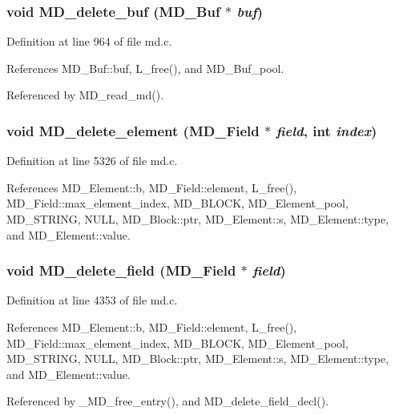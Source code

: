 \subsubsection{\setlength{\rightskip}{0pt plus 5cm}void MD\_\-delete\_\-buf (\bf{MD\_\-Buf} $\ast$ {\em buf})}\label{md_8c_765d5d55709d6e3d548642e0adef32a1}




Definition at line 964 of file md.c.

References MD\_\-Buf::buf, L\_\-free(), and MD\_\-Buf\_\-pool.

Referenced by MD\_\-read\_\-md().
\subsubsection{\setlength{\rightskip}{0pt plus 5cm}void MD\_\-delete\_\-element (\bf{MD\_\-Field} $\ast$ {\em field}, int {\em index})}\label{md_8c_323c95e323e8e32f489e998a83f87c53}




Definition at line 5326 of file md.c.

References MD\_\-Element::b, MD\_\-Field::element, L\_\-free(), MD\_\-Field::max\_\-element\_\-index, MD\_\-BLOCK, MD\_\-Element\_\-pool, MD\_\-STRING, NULL, MD\_\-Block::ptr, MD\_\-Element::s, MD\_\-Element::type, and MD\_\-Element::value.
\subsubsection{\setlength{\rightskip}{0pt plus 5cm}void MD\_\-delete\_\-field (\bf{MD\_\-Field} $\ast$ {\em field})}\label{md_8c_a6e7b63f7fd6d15327aff3b6e0c6ff61}




Definition at line 4353 of file md.c.

References MD\_\-Element::b, MD\_\-Field::element, L\_\-free(), MD\_\-Field::max\_\-element\_\-index, MD\_\-BLOCK, MD\_\-Element\_\-pool, MD\_\-STRING, NULL, MD\_\-Block::ptr, MD\_\-Element::s, MD\_\-Element::type, and MD\_\-Element::value.

Referenced by \_\-MD\_\-free\_\-entry(), and MD\_\-delete\_\-field\_\-decl().
